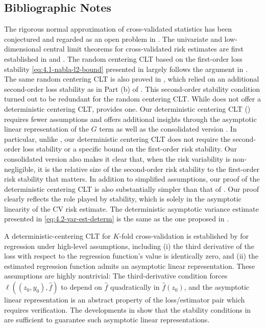 \documentclass[11pt]{article}
\theoremstyle{plain}
\begin{document}
\subsection{Bibliographic Notes}\label{subsec:4.5-bib}
The rigorous normal approximation of cross-validated statistics has been conjectured and regarded as an open problem in \cite{yang2006comparing}.
The univariate and low-dimensional central limit theorems for cross-validated risk estimates are first established in \cite{bayle2020cross} and \cite{austern2020}. The random centering CLT based on the first-order loss stability \eqref{eq:4.1-nabla-l2-bound} presented in  largely follows the argument in \cite{bayle2020cross}.  The same random centering CLT is also proved in \cite{austern2020}, which relied on an additional second-order loss stability as in Part (b) of . This second-order stability condition turned out to be redundant for the random centering CLT.    While \cite{bayle2020cross} does not offer a deterministic centering CLT, \cite{austern2020} provides one.  Our deterministic centering CLT () requires fewer assumptions and offers additional insights through the asymptotic linear representation of the $G$ term as well as the consolidated version .  In particular, unlike \cite{austern2020}, our deterministic centering CLT does not require the second-order loss stability or a specific bound on the first-order risk stability.  Our consolidated version  also makes it clear that, when the risk variability is non-negligible, it is the relative size of the second-order risk stability to the first-order risk stability that matters.   In addition to simplified assumptions, our proof of the deterministic centering CLT is also substantially simpler than that of \cite{austern2020}.  Our proof clearly reflects the role played by stability, which is solely in the asymptotic linearity of the CV risk estimate. The deterministic asymptotic variance estimate presented in \eqref{eq:4.2-var-est-determ} is the same as the one proposed in \cite{austern2020}.  


A deterministic-centering CLT for \(K\)-fold cross-validation is established by \cite{li2023asymptotics} for regression under high-level assumptions, including (i) the third derivative of the loss with respect to the regression function’s value is identically zero, and (ii) the estimated regression function admits an asymptotic linear representation. These assumptions are highly nontrivial: The third-derivative condition forces \(\ell((z_0,y_0),\hat f)\) to depend on \(\hat f\) quadratically in \(\hat f(z_0)\), and the asymptotic linear representation is an abstract property of the loss/estimator pair which requires verification.
The developments in  show that the stability conditions in  are sufficient to guarantee such asymptotic linear representations.
\end{document}
